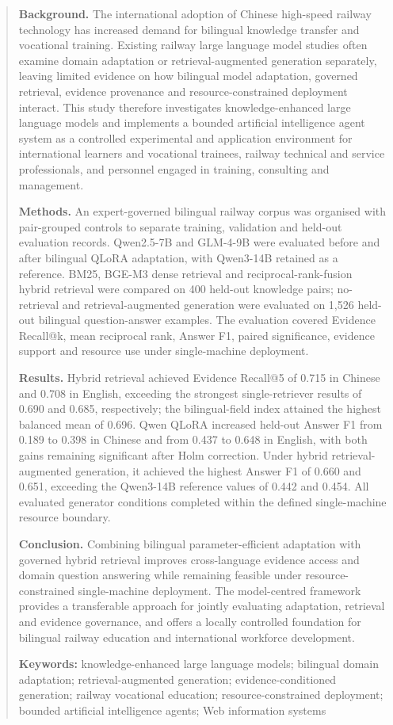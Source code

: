 
\begin{abstract}

\textbf{Background.} The international adoption of Chinese high-speed railway technology has increased demand for bilingual knowledge transfer and vocational training. Existing railway large language model studies often examine domain adaptation or retrieval-augmented generation separately, leaving limited evidence on how bilingual model adaptation, governed retrieval, evidence provenance and resource-constrained deployment interact. This study therefore investigates knowledge-enhanced large language models and implements a bounded artificial intelligence agent system as a controlled experimental and application environment for international learners and vocational trainees, railway technical and service professionals, and personnel engaged in training, consulting and management.

\textbf{Methods.} An expert-governed bilingual railway corpus was organised with pair-grouped controls to separate training, validation and held-out evaluation records. Qwen2.5-7B and GLM-4-9B were evaluated before and after bilingual QLoRA adaptation, with Qwen3-14B retained as a reference. BM25, BGE-M3 dense retrieval and reciprocal-rank-fusion hybrid retrieval were compared on 400 held-out knowledge pairs; no-retrieval and retrieval-augmented generation were evaluated on 1,526 held-out bilingual question-answer examples. The evaluation covered Evidence Recall@k, mean reciprocal rank, Answer F1, paired significance, evidence support and resource use under single-machine deployment.

\textbf{Results.} Hybrid retrieval achieved Evidence Recall@5 of 0.715 in Chinese and 0.708 in English, exceeding the strongest single-retriever results of 0.690 and 0.685, respectively; the bilingual-field index attained the highest balanced mean of 0.696. Qwen QLoRA increased held-out Answer F1 from 0.189 to 0.398 in Chinese and from 0.437 to 0.648 in English, with both gains remaining significant after Holm correction. Under hybrid retrieval-augmented generation, it achieved the highest Answer F1 of 0.660 and 0.651, exceeding the Qwen3-14B reference values of 0.442 and 0.454. All evaluated generator conditions completed within the defined single-machine resource boundary.

\textbf{Conclusion.} Combining bilingual parameter-efficient adaptation with governed hybrid retrieval improves cross-language evidence access and domain question answering while remaining feasible under resource-constrained single-machine deployment. The model-centred framework provides a transferable approach for jointly evaluating adaptation, retrieval and evidence governance, and offers a locally controlled foundation for bilingual railway education and international workforce development.

\textbf{Keywords:} knowledge-enhanced large language models; bilingual domain adaptation; retrieval-augmented generation; evidence-conditioned generation; railway vocational education; resource-constrained deployment; bounded artificial intelligence agents; Web information systems

\end{abstract}
